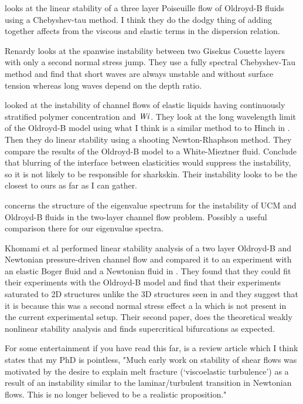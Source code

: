 \documentclass{jfm}
\newcommand\Wi{\mbox{\textit{Wi}}}
\begin{document}
\citet{Scotto1999} looks at the linear stability of a three layer Poiseuille
flow of Oldroyd-B fluids using a Chebyshev-tau method. I think they do the
dodgy thing of adding together affects from the viscous and elastic terms in
the dispersion relation.

Renardy \citep{Renardy1999} looks at the spanwise instability between two
Gisekus Couette layers with only a second normal stress jump. They use a fully
spectral Chebyshev-Tau method and find that short waves are always unstable and
without surface tension whereas long waves depend on the depth ratio.

\citet{Wilson1999a} looked at the instability of channel flows of
elastic liquids having continuously stratified polymer concentration and $\Wi$.
They look at the long wavelength limit of the Oldroyd-B model using what I
think is a similar method to to Hinch in \citet{Azaiez1994}. Then they do
linear stability using a shooting Newton-Rhaphson method. They compare the
results of the Oldroyd-B model to a White-Mieztner fluid. Conclude that
blurring of the interface between elasticities would suppress the instability,
so it is not likely to be responsible for sharkskin. Their instability looks to
be the closest to ours as far as I can gather.

\citet{Wilson1999b} concerns the structure of the eigenvalue spectrum
for the instability of UCM and Oldroyd-B fluids in the two-layer channel flow
problem. Possibly a useful comparison there for our eigenvalue spectra.

Khomami et al performed linear stability analysis of a two layer Oldroyd-B and
Newtonian pressure-driven channel flow and compared it to an experiment with an
elastic Boger fluid and a Newtonian fluid in \citep{Khomami2000a, Khomami2000b}.
They found that they could fit their experiments with the Oldroyd-B model and
find that their experiments saturated to 2D structures unlike the 3D structures
seen in \citep{Khomami1997} and they suggest that it is because this was a
second normal stress effect a la \citep{Renardy1999} which is not present in the
current experimental setup. Their second paper, \citep{Khomami2000b} does the
theoretical weakly nonlinear stability analysis and finds supercritical
bifurcations as expected.

For some entertainment if you have read this far, \citep{Renardy2000} is a
review article which I think states that my PhD is pointless, "Much early work
on stability of shear flows was motivated by the desire to explain melt
fracture (‘viscoelastic turbulence’) as a result of an instability similar to
the laminar/turbulent transition in Newtonian flows. This is no longer believed
to be a realistic proposition."
\end{document}
